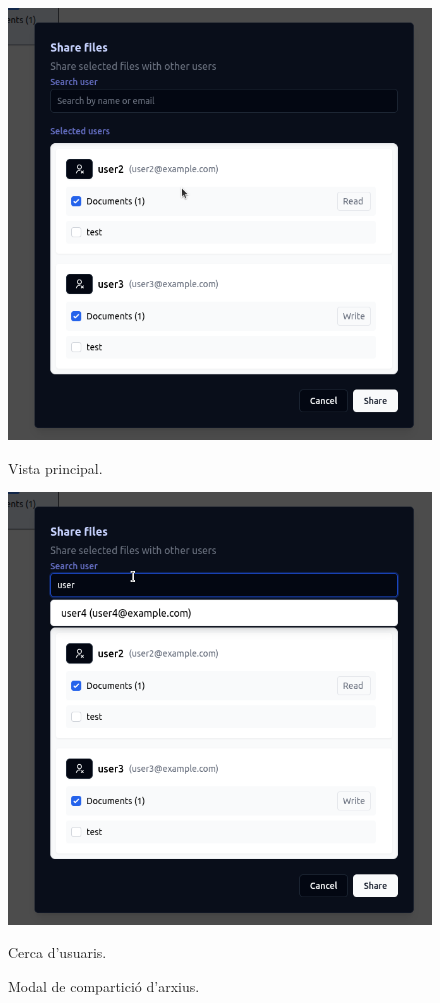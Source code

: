 \begin{figure}[H]
    \centering
    \begin{minipage}{0.48\textwidth}
        \centering
        \includegraphics[width=\linewidth]{Figures/ui-web/share_dialog.png}
        \caption{Vista principal.}
    \end{minipage}\hfill
    \begin{minipage}{0.48\textwidth}
        \centering
        \includegraphics[width=\linewidth]{Figures/ui-web/share_dialog_search.png}
        \caption{Cerca d'usuaris.}
    \end{minipage}
    \caption{Modal de compartició d'arxius.}
    \label{fig:react-share-impl}
\end{figure}

